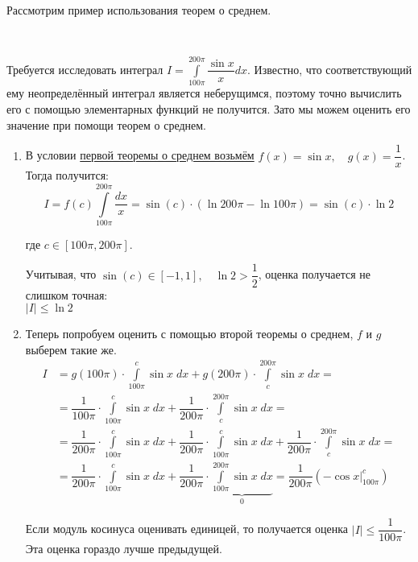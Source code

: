 \documentclass[../main.tex]{subfiles}
\begin{document}
Рассмотрим пример использования теорем о среднем. 

\begin{example}
    
    ~

    Требуется исследовать интеграл \( I= \displaystyle\int\limits_{ 100 \pi }^{ 200 \pi } \dfrac{ \sin x}{ x} dx\). Известно, что соответствующий ему неопределённый интеграл является неберущимся, поэтому точно вычислить его с помощью элементарных функций не получится. Зато мы можем оценить его значение при помощи теорем о среднем. 

    \begin{enumerate}
        \item В условии \hyperlink{thm:first_average}{первой теоремы о среднем возьмём} \( f\left( x\right)=\sin x,\quad g \left( x\right) = \dfrac{ 1}{ x} \). Тогда получится:
        \[ I=f \left( c\right) \displaystyle\int\limits_{ 100 \pi }^{ 200 \pi } \dfrac{ dx}{ x} =\sin \left( c\right) \cdot \left( \ln 200 \pi - \ln 100 \pi \right)=\sin \left( c\right) \cdot \ln 2\]
        \par где \( c \in \left[ 100 \pi , 200 \pi \right]\). 
        \par Учитывая, что \( \sin \left( c\right) \in \left[ -1, 1\right],\quad \ln 2 > \dfrac{ 1}{ 2} \), оценка получается не слишком точная: \\
        \( \left| I\right| \leq \ln 2\)
        \item Теперь попробуем оценить с помощью второй теоремы о среднем, \( f\) и \( g\) выберем такие же. 
        \begin{equation*}
            \begin{aligned}
                I&=g \left( 100 \pi \right) \cdot \displaystyle\int\limits_{ 100 \pi }^{ c} \sin x\; dx + g \left( 200 \pi \right) \cdot  \displaystyle\int\limits_{ c}^{ 200 \pi } \sin x\;dx=\\ 
                &= \dfrac{ 1}{ 100 \pi } \cdot \displaystyle\int\limits_{ 100 \pi }^{ c} \sin x \; dx + \dfrac{ 1}{ 200 \pi } \cdot \displaystyle\int\limits_{ c}^{ 200 \pi } \sin x\;dx=\\
                &= \dfrac{ 1}{ 200 \pi } \cdot \displaystyle\int\limits_{ 100 \pi }^{ c} \sin x\; dx + \dfrac{ 1}{ 200 \pi } \cdot  \displaystyle\int\limits_{ 100 \pi }^{ c} \sin x\;dx + \dfrac{ 1}{ 200 \pi } \cdot \displaystyle\int\limits_{ c}^{ 200 \pi } \sin x\;dx=\\
                &= \dfrac{ 1}{ 200 \pi } \cdot \displaystyle\int\limits_{ 100 \pi }^{ c} \sin x\; dx + \dfrac{ 1}{ 200 \pi } \cdot \underbrace{\displaystyle\int\limits_{ 100 \pi }^{ 200 \pi } \sin x\; dx}_0= \dfrac{ 1}{ 200 \pi} \left( - \cos x\bigg|_{100\pi}^c\right)  
            \end{aligned}
        \end{equation*}
        \par Если модуль косинуса оценивать единицей, то получается оценка \( \left| I\right| \leq \dfrac{ 1}{ 100 \pi } \). Эта оценка гораздо лучше предыдущей. 
    \end{enumerate}
\end{example}
\end{document}
